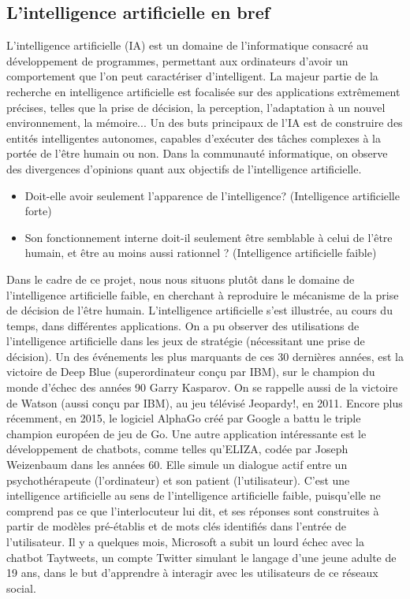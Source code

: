 \documentclass[12pt]{article}
\begin{document}
\subsection{L'intelligence artificielle en bref}
\justify
L'intelligence artificielle (IA) est un domaine de l'informatique consacré au développement de programmes, permettant aux ordinateurs d'avoir un comportement que l'on peut caractériser d'intelligent. La majeur partie de la recherche en intelligence artificielle est focalisée sur des applications extrêmement précises, telles que la prise de décision, la perception, l'adaptation à un nouvel environnement, la mémoire... 
\justify
Un des buts principaux de l'IA est de construire des entités intelligentes autonomes, capables d'exécuter des tâches complexes à la portée de l'être humain ou non. 
\justify
Dans la communauté informatique, on observe des divergences d'opinions quant aux objectifs de l'intelligence artificielle. 
\begin{itemize}
\item Doit-elle avoir seulement l'apparence de l'intelligence? (Intelligence artificielle forte)
\item Son fonctionnement interne doit-il seulement être semblable à celui de l'être humain, et être au moins aussi rationnel ? (Intelligence artificielle faible)
\end{itemize}
Dans le cadre de ce projet, nous nous situons plutôt dans le domaine de l'intelligence artificielle faible, en cherchant à reproduire le mécanisme de la prise de décision de l'être humain. 
\justify
L'intelligence artificielle s'est illustrée, au cours du temps, dans différentes applications. On a pu observer des utilisations de l'intelligence artificielle dans les jeux de stratégie (nécessitant une prise de décision). 
\justify
Un des événements les plus marquants de ces 30 dernières années, est la victoire de Deep Blue (superordinateur conçu par IBM), sur le champion du monde d'échec des années 90 Garry Kasparov. On se rappelle aussi de la victoire de Watson (aussi conçu par IBM), au jeu télévisé Jeopardy!, en 2011. Encore plus récemment, en 2015, le logiciel AlphaGo créé par Google a battu le triple champion européen de jeu de Go.
\justify
Une autre application intéressante est le développement de chatbots, comme telles qu'ELIZA, codée par Joseph Weizenbaum dans les années 60. Elle simule un dialogue actif entre un psychothérapeute (l'ordinateur) et son patient (l'utilisateur). C'est une intelligence artificielle au sens de l'intelligence artificielle faible, puisqu'elle ne comprend pas ce que l'interlocuteur lui dit, et ses réponses sont construites à partir de modèles pré-établis et de mots clés identifiés dans l'entrée de l'utilisateur.
\justify
Il y a quelques mois, Microsoft a subit un lourd échec avec la chatbot Taytweets, un compte Twitter simulant le langage d'une jeune adulte de 19 ans, dans le but d'apprendre à interagir avec les utilisateurs de ce réseaux social.
\end{document}
